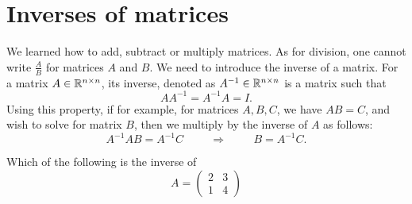 \documentclass{ximera}
\begin{document}
\section{Inverses of matrices}


We learned how to add, subtract or multiply matrices. As for division,
one cannot write $\frac{A}{B}$ for matrices $A$ and $B$. We need to
introduce the inverse of a matrix. For a matrix $A \in \mathbb{R}^{n\times n}$, its
inverse, denoted as $A^{-1} \in \mathbb{R}^{n\times n}$ is a matrix such that
\begin{equation}\label{inverse}
AA^{-1}= A^{-1}A = I.
\end{equation}
Using this property, if for example, for matrices $A, B, C$, we have $AB = C$, and wish to solve for matrix $B$, then we multiply by the inverse of $A$ as follows:
\begin{equation*}
A^{-1}AB= A^{-1}C \hspace{1cm} \Rightarrow \hspace{1cm} B = A^{-1}C.
\end{equation*}

\begin{question}
  Which of the following is the inverse of
  \begin{equation*}
    A= \left(
      \begin{array}{cc}
        2 & 3   \\
        1 &  4
      \end{array}
    \right)
  \end{equation*}
  \begin{multipleChoice}
    \pdfOnly{\end{multicols}}
  \end{multipleChoice}
\end{question}
\end{document}
